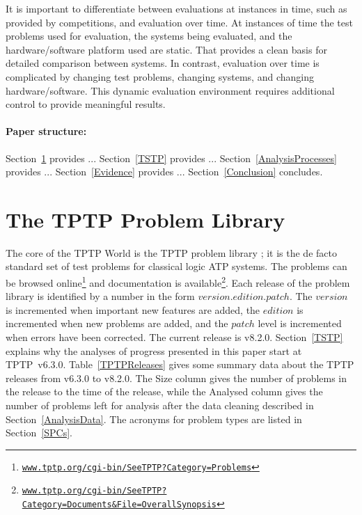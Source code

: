 \documentclass[runningheads]{llncs}
\begin{document}
It is important to differentiate between evaluations at instances in time, such as provided by
competitions, and evaluation over time.
At instances of time the test problems used for evaluation, the systems being evaluated, and
the hardware/software platform used are static.
That provides a clean basis for detailed comparison between systems.
In contrast, evaluation over time is complicated by changing test problems, changing systems,
and changing hardware/software.
This dynamic evaluation environment requires additional control to provide meaningful results.

\paragraph{Paper structure:}
Section~\ref{TPTP} provides ...
Section~\ref{TSTP} provides ...
Section~\ref{AnalysisProcesses} provides ...
Section~\ref{Evidence} provides ...
Section~\ref{Conclusion} concludes. 

\section{The TPTP Problem Library}
\label{TPTP}

The core of the TPTP World is the TPTP problem library \cite{Sut09}; it is the de facto standard 
set of test problems for classical logic ATP systems.
The problems can be browsed online\footnote{%
\href{https://www.tptp.org/cgi-bin/SeeTPTP?Category=Problems}
{\tt www.tptp.org/cgi-bin/SeeTPTP?Category=Problems}}
and documentation is available\footnote{%
\href{https://www.tptp.org/cgi-bin/SeeTPTP?Category=Documents\&File=OverallSynopsis}
{\tt www.tptp.org/cgi-bin/SeeTPTP?Category=Documents\&File=OverallSynopsis}}.
Each release of the problem library is identified by a number in the form 
$version$.$edition$.$patch$.
The $version$ is incremented when important new features are added,
the $edition$ is incremented when new problems are added, and
the $patch$ level is incremented when errors have been corrected.
The current release is v8.2.0.
Section~\ref{TSTP} explains why the analyses of progress presented in this paper start at
TPTP~v6.3.0.
Table~\ref{TPTPReleases} gives some summary data about the TPTP releases from v6.3.0 to v8.2.0.
The Size column gives the number of problems in the release to the time of the release, while
the Analysed column gives the number of problems left for analysis after the data cleaning 
described in Section~\ref{AnalysisData}.
The acronyms for problem types are listed in Section~\ref{SPCs}.
\end{document}

